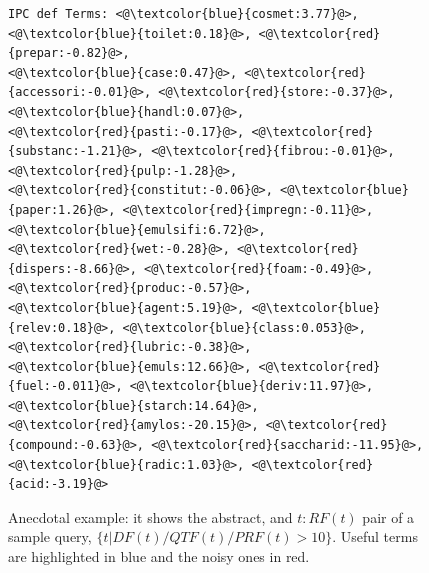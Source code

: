 \begin{figure}[htpb]
\begin{framed}
\begin{lstlisting}[basicstyle=\scriptsize\ttfamily , linewidth=\columnwidth,breaklines=true]
IPC def Terms: <@\textcolor{blue}{cosmet:3.77}@>, <@\textcolor{blue}{toilet:0.18}@>, <@\textcolor{red}{prepar:-0.82}@>, 
<@\textcolor{blue}{case:0.47}@>, <@\textcolor{red}{accessori:-0.01}@>, <@\textcolor{red}{store:-0.37}@>, <@\textcolor{blue}{handl:0.07}@>, 
<@\textcolor{red}{pasti:-0.17}@>, <@\textcolor{red}{substanc:-1.21}@>, <@\textcolor{red}{fibrou:-0.01}@>, <@\textcolor{red}{pulp:-1.28}@>, 
<@\textcolor{red}{constitut:-0.06}@>, <@\textcolor{blue}{paper:1.26}@>, <@\textcolor{red}{impregn:-0.11}@>, <@\textcolor{blue}{emulsifi:6.72}@>, 
<@\textcolor{red}{wet:-0.28}@>, <@\textcolor{red}{dispers:-8.66}@>, <@\textcolor{red}{foam:-0.49}@>, <@\textcolor{red}{produc:-0.57}@>, 
<@\textcolor{blue}{agent:5.19}@>, <@\textcolor{blue}{relev:0.18}@>, <@\textcolor{blue}{class:0.053}@>, <@\textcolor{red}{lubric:-0.38}@>, 
<@\textcolor{blue}{emuls:12.66}@>, <@\textcolor{red}{fuel:-0.011}@>, <@\textcolor{blue}{deriv:11.97}@>, <@\textcolor{blue}{starch:14.64}@>, 
<@\textcolor{red}{amylos:-20.15}@>, <@\textcolor{red}{compound:-0.63}@>, <@\textcolor{red}{saccharid:-11.95}@>, 
<@\textcolor{blue}{radic:1.03}@>, <@\textcolor{red}{acid:-3.19}@> 
 \end{lstlisting} 
 \vspace*{-2ex}
\end{framed}
 \vspace*{-2ex}
  \caption{Anecdotal example: it shows the abstract, and $ t:RF(t) $ pair of a sample query, $\{t|DF(t)/QTF(t)/PRF(t)>10\}$. Useful terms are highlighted in blue and the noisy ones in red.}
  \label{fig:anecdotal}  
\end{figure}

